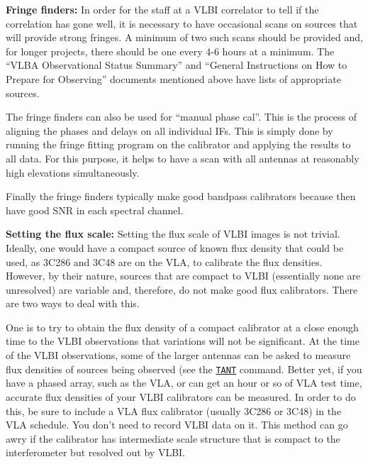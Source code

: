 \documentclass{report}
\begin{document}
\begin{list}{}{\parsep .5em  \itemsep .5em }

\item {\bf Fringe finders:} In order for the staff at a VLBI
correlator to tell if the correlation has gone well, it is necessary
to have occasional scans on sources that will provide strong fringes.
A minimum of two such scans should be provided and, for longer
projects, there should be one every 4-6 hours at a minimum.  The
``VLBA Observational Status Summary'' and ``General Instructions on
How to Prepare for Observing'' documents mentioned above have lists of
appropriate sources.

The fringe finders can also be used for ``manual phase cal''.  This is
the process of aligning the phases and delays on all individual IFs.
This is simply done by running the fringe fitting program on the
calibrator and applying the results to all data.  For this purpose, it
helps to have a scan with all antennas at reasonably high elevations
simultaneously.

Finally the fringe finders typically make good bandpass calibrators
because then have good SNR in each spectral channel.

\item {\bf Setting the flux scale:} Setting the flux scale of VLBI
images is not trivial.  Ideally, one would have a compact source of
known flux density that could be used, as 3C286 and 3C48 are on the
VLA, to calibrate the flux densities.  However, by their nature, sources
that are compact to VLBI (essentially none are unresolved) are variable
and, therefore, do not make good flux calibrators.  There are two ways
to deal with this.

One is to try to obtain the flux density of a compact calibrator at a
close enough time to the VLBI observations that variations will not be
significant.  At the time of the VLBI observations, some of the larger
antennas can be asked to measure flux densities of sources being
observed (see the 
{\hyperref[MP:TANT1]{{\tt TANT}}} command.  Better yet,
if you have a phased array, such as the VLA, or can get an hour or so of
VLA test time, accurate flux densities of your VLBI calibrators can be
measured.  In order to do this, be sure to include a VLA flux calibrator
(usually 3C286 or 3C48) in the VLA schedule.  You don't need to
record VLBI data on it.  This method can go awry if the calibrator has
intermediate scale structure that is compact to the interferometer but 
resolved out by VLBI.


\end{list}
\end{document}
